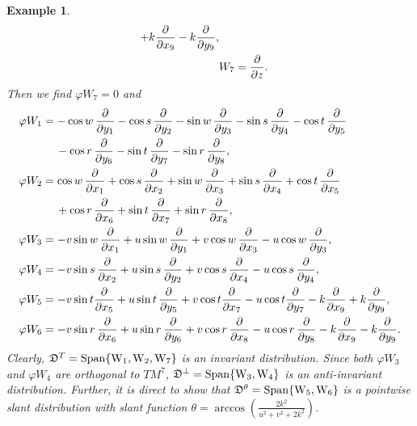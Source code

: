 \documentclass[reqno]{amsart}
\theoremstyle{plain}
\newtheorem{example}{Example}[section]
\theoremstyle{remark}
\numberwithin{equation}{section}
\begin{document}
\begin{example}
{\begin{align}
+k\frac{\partial}{\partial x_9}-k\frac{\partial}{\partial y_9},
\\&\notag W_7=\frac{\partial}{\partial z}.
\end{align}
Then we find $\varphi W_7=0$ and
\begin{align}\notag
&\varphi W_1=-\cos w\,\frac{\partial}{\partial y_1}-\cos s\,\frac{\partial}{\partial y_2}-\sin w\,\frac{\partial}{\partial y_3}-\sin s\,\frac{\partial}{\partial y_4}-\cos t\,\frac{\partial}{\partial y_5}
\\&\notag \hskip.45in -\cos r\,\frac{\partial}{\partial y_6}-\sin t\,\frac{\partial}{\partial y_7}-\sin r\,\frac{\partial}{\partial y_8},
\\&\notag  \varphi W_2=\cos w\,\frac{\partial}{\partial x_1}+\cos s\,\frac{\partial}{\partial x_2}+\sin w\,\frac{\partial}{\partial x_3}+\sin s\,\frac{\partial}{\partial x_4}+\cos t\,\frac{\partial}{\partial x_5}
\\&\notag \hskip.45in +\cos r\,\frac{\partial}{\partial x_6}+\sin t\,\frac{\partial}{\partial x_7}+\sin r\,\frac{\partial}{\partial x_8},
 \\&\label{7.4} \varphi W_3=-v\sin w\,\frac{\partial}{\partial x_1}+u\sin w\,\frac{\partial}{\partial y_1}+v\cos w\,\frac{\partial}{\partial x_3}-u\cos w\,\frac{\partial}{\partial y_3},
\\ &\notag  \varphi W_4=-v\sin s\,\frac{\partial}{\partial x_2}+ u\sin s\,\frac{\partial}{\partial y_2}+v\cos s\,\frac{\partial}{\partial x_4}-u\cos s\,\frac{\partial}{\partial y_4},
\\&\notag \varphi W_5=-v\sin t\frac{\partial}{\partial x_5}+u\sin t\,\frac{\partial}{\partial y_5}+v\cos t\frac{\partial}{\partial x_7}-u\cos t\frac{\partial}{\partial y_7}-k\frac{\partial}{\partial x_9}
 +k\frac{\partial}{\partial y_9}, \\
&\notag \varphi W_6=-v\sin r\,\frac{\partial}{\partial x_6}+u\sin r\,\frac{\partial}{\partial y_6}+v\cos r\,\frac{\partial}{\partial x_8}-u\cos r\,\frac{\partial}{\partial y_8}-k\frac{\partial}{\partial x_9}  -k\frac{\partial}{\partial y_9}.
\end{align}
Clearly, ${\mathfrak{D}^{T}}=\rm{Span}\{W_1,W_2,W_{7}\}$ is an invariant distribution. Since both $\varphi W_3$ and $\varphi W_4$ are orthogonal to $TM^{7}$, ${\mathfrak{D}}^{\perp}=\rm{Span}\{W_3, W_4\}$ is an anti-invariant distribution. Further, it is direct to show that ${\mathfrak{D}^{\theta}}=\rm{Span}\{W_5,W_6\}$ is a pointwise slant distribution with slant function $\theta=\arccos (\frac{2k^2}{u^2+v^2+2k^2})$. 

}
\end{example}
\end{document}
